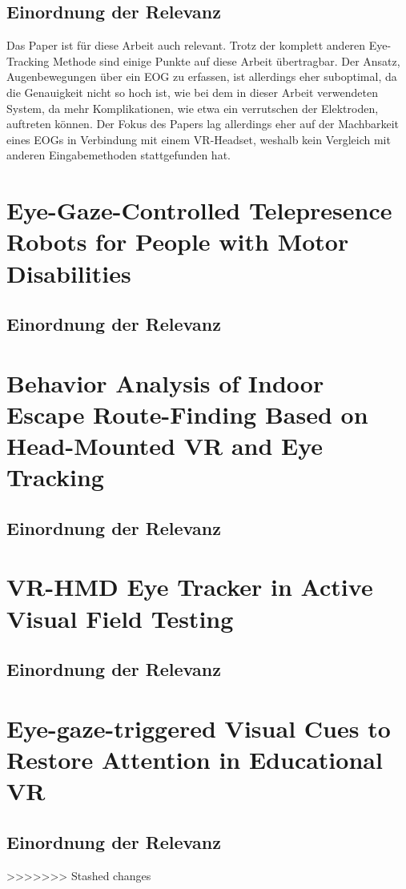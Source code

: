 \subsection{Einordnung der Relevanz}
Das Paper ist für diese Arbeit auch relevant. Trotz der komplett anderen Eye-Tracking Methode sind einige Punkte auf diese Arbeit übertragbar. Der Ansatz, Augenbewegungen über ein EOG zu erfassen, ist allerdings eher suboptimal, da die Genauigkeit nicht so hoch ist, wie bei dem in dieser Arbeit verwendeten System, da mehr Komplikationen, wie etwa ein verrutschen der Elektroden, auftreten können. Der Fokus des Papers lag allerdings eher auf der Machbarkeit eines EOGs in Verbindung mit einem VR-Headset, weshalb kein Vergleich mit anderen Eingabemethoden stattgefunden hat. 

\section{Eye-Gaze-Controlled Telepresence Robots for People with Motor Disabilities}

\subsection{Einordnung der Relevanz}

\section{Behavior Analysis of Indoor Escape Route-Finding Based on Head-Mounted VR and Eye Tracking}

\subsection{Einordnung der Relevanz}

\section{VR-HMD Eye Tracker in Active Visual Field Testing}

\subsection{Einordnung der Relevanz}

\section{Eye-gaze-triggered Visual Cues to Restore Attention in Educational VR}

\subsection{Einordnung der Relevanz}





>>>>>>> Stashed changes

